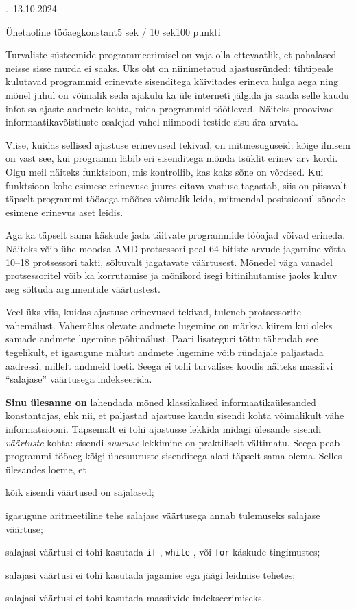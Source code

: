 \documentclass[a4paper,11pt]{article}
\begin{document}
\begin{ol}{\eio}{.--13.10.2024}{\yle}{}
\begin{yl}{7}{Ühetaoline tööaeg}{konstant}{5 sek / 10 sek}{100 punkti}

	Turvaliste süsteemide programmeerimisel on vaja olla ettevaatlik, et pahalased neisse sisse murda ei saaks. Üks oht on niinimetatud ajastusründed: tihtipeale kulutavad programmid erinevate sisenditega käivitades erineva hulga aega ning mõnel juhul on võimalik seda ajakulu ka üle interneti jälgida ja saada selle kaudu infot salajaste andmete kohta, mida programmid töötlevad. Näiteks proovivad informaatikavõistluste osalejad vahel niimoodi testide sisu ära arvata.

	Viise, kuidas sellised ajastuse erinevused tekivad, on mitmesuguseid: kõige ilmsem on vast see, kui programm läbib eri sisenditega mõnda tsüklit erinev arv kordi. Olgu meil näiteks funktsioon, mis kontrollib, kas kaks sõne on võrdsed. Kui funktsioon kohe esimese erinevuse juures eitava vastuse tagastab, siis on piisavalt täpselt programmi tööaega mõõtes võimalik leida, mitmendal positsioonil sõnede esimene erinevus aset leidis.

	Aga ka täpselt sama käskude jada täitvate programmide tööajad võivad erineda. Näiteks võib ühe moodsa AMD protsessori peal 64-bitiste arvude jagamine võtta 10--18 protsessori takti, sõltuvalt jagatavate väärtusest. Mõnedel väga vanadel protsessoritel võib ka korrutamise ja mõnikord isegi bitinihutamise jaoks kuluv aeg sõltuda argumentide väärtustest.

	Veel üks viis, kuidas ajastuse erinevused tekivad, tuleneb protsessorite vahemälust. Vahemälus olevate andmete lugemine on märksa kiirem kui oleks samade andmete lugemine põhimälust. Paari lisateguri tõttu tähendab see tegelikult, et igasugune mälust andmete lugemine võib ründajale paljastada aadressi, millelt andmeid loeti. Seega ei tohi turvalises koodis näiteks massiivi \enquote{salajase} väärtusega indekseerida.

	\textbf{Sinu ülesanne on} lahendada mõned klassikalised informaatikaülesanded konstantajas, ehk nii, et paljastad ajastuse kaudu sisendi kohta võimalikult vähe informatsiooni. Täpsemalt ei tohi ajastusse lekkida midagi ülesande sisendi \emph{väärtuste} kohta: sisendi \emph{suuruse} lekkimine on praktiliselt vältimatu. Seega peab programmi tööaeg kõigi ühesuuruste sisenditega alati täpselt sama olema. Selles ülesandes loeme, et
	\begin{xitem}
		\item kõik sisendi väärtused on sajalased;
		\item igasugune aritmeetiline tehe salajase väärtusega annab tulemuseks salajase väärtuse;
		\item salajasi väärtusi ei tohi kasutada \texttt{if}-, \texttt{while}-, või \texttt{for}-käskude tingimustes;
		\item salajasi väärtusi ei tohi kasutada jagamise ega jäägi leidmise tehetes;
		\item salajasi väärtusi ei tohi kasutada massiivide indekseerimiseks.
	\end{xitem}


\end{yl}
\end{ol}
\end{document}
